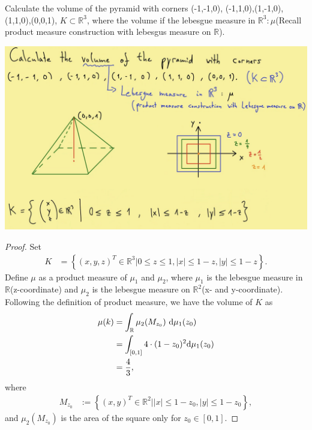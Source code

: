 \documentclass[../../note.tex]{subfiles}
\begin{document}
\begin{example}
    Calculate the volume of the pyramid with corners 
    (-1,-1,0), (-1,1,0),(1,-1,0),(1,1,0),(0,0,1), $K \subset \mathbb{R}^3 $, where the volume if the lebesgue measure in $\mathbb{R}^3: \mu$(Recall product measure construction with lebesgus measure on $\mathbb{R}$).

    \includegraphics[scale=0.30]{../figures/pyramid.png}
    \begin{proof}
        Set
        \begin{align}
            K
            &= \left\{(x,y,z)^T \in \mathbb{R}^3 \vert 0 \leq z \leq 1, \vert x \vert \leq 1-z, \vert y \vert \leq 1-z \right\}.
        \end{align}
        Define $\mu$ as a product measure of $\mu_1$ and $\mu_2$, where $\mu_1$ is the lebesgue measure in $\mathbb{R}$(z-coordinate) and $\mu_2$ is the lebesgue measure on $\mathbb{R}^2$(x- and y-coordinate). Following the definition of product measure, we have the volume of $K$ as
        \begin{align}
            \mu(k)
            &= \int_{\mathbb{R}} \mu_2(M_{z_0})~{\rm d}\mu_1(z_0) \\
            &= \int_{[0,1]} 4 \cdot (1-z_0)^2{\rm d}\mu_1(z_0) \\
            &= \frac{4}{3},
        \end{align}
        where 
        \begin{align}
            M_{z_0}
            &:= \left\{(x,y)^T \in \mathbb{R}^2 \vert \vert x \vert \leq 1-z_0, \vert y \vert \leq 1-z_0 \right\},
        \end{align}
        and $\mu_2(M_{z_0})$ is the area of the square only for $z_0 \in [0,1]$.
    \end{proof}
\end{example}
\end{document}
